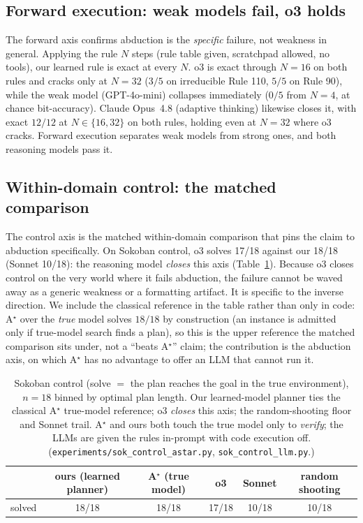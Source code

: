 \documentclass{article}
\begin{document}
\subsection{Forward execution: weak models fail, o3 holds}

The forward axis confirms abduction is the \emph{specific} failure, not weakness in general. Applying
the rule $N$ steps (rule table given, scratchpad allowed, no tools), our learned rule is exact at every
$N$. o3 is exact through $N=16$ on both rules and cracks only at $N=32$ ($3/5$ on irreducible Rule 110,
$5/5$ on Rule 90), while the weak model (GPT-4o-mini) collapses immediately ($0/5$ from $N=4$, at
chance bit-accuracy). Claude Opus~4.8 (adaptive thinking) likewise closes it, with exact $12/12$ at
$N\in\{16,32\}$ on both rules, holding even at $N{=}32$ where o3 cracks. Forward execution separates
weak models from strong ones, and both reasoning models pass it.

\subsection{Within-domain control: the matched comparison}

The control axis is the matched within-domain comparison that pins the claim to abduction
specifically. On Sokoban control, o3 solves 17/18 against our 18/18 (Sonnet 10/18): the reasoning
model \emph{closes} this axis (Table~\ref{tab:control}). Because o3 closes control on the very world
where it fails abduction, the failure cannot be waved away as a generic weakness or a formatting
artifact. It is specific to the inverse direction. We include the classical reference in the table
rather than only in code: A$^\star$ over the \emph{true} model solves $18/18$ by construction (an
instance is admitted only if true-model search finds a plan), so this is the upper reference the
matched comparison sits under, not a ``beats A$^\star$'' claim; the contribution is the abduction
axis, on which A$^\star$ has no advantage to offer an LLM that cannot run it.

\begin{table}[t]
\centering
\caption{Sokoban control (solve $=$ the plan reaches the goal in the true environment), $n=18$
binned by optimal plan length. Our learned-model planner ties the classical A$^\star$ true-model
reference; o3 \emph{closes} this axis; the random-shooting floor and Sonnet trail. A$^\star$ and
ours both touch the true model only to \emph{verify}; the LLMs are given the rules in-prompt with
code execution off. (\texttt{experiments/sok\_control\_astar.py}, \texttt{sok\_control\_llm.py}.)}
\label{tab:control}
\begin{tabular}{@{}lccccc@{}}
\toprule
 & ours (learned planner) & A$^\star$ (true model) & o3 & Sonnet & random shooting \\
\midrule
solved & 18/18 & 18/18 & 17/18 & 10/18 & 10/18 \\
\bottomrule
\end{tabular}
\end{table}
\end{document}
